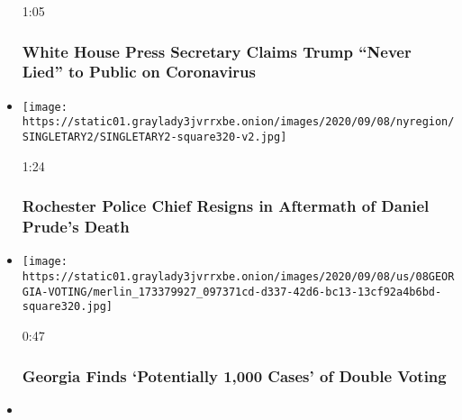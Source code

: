 \begin{itemize}
  1:05

  \hypertarget{white-house-press-secretary-claims-trump-never-lied-to-public-on-coronavirus}{%
  \subsubsection{White House Press Secretary Claims Trump ``Never Lied''
  to Public on
  Coronavirus}\label{white-house-press-secretary-claims-trump-never-lied-to-public-on-coronavirus}}
\item
  \href{https://www.nytimes3xbfgragh.onion/video/us/politics/100000007330362/rochester-police-chief-resigns-video.html?action=click\&module=video-series-bar\&region=header\&pgtype=Article\&playlistId=video/us-politics}{}

  \texttt{[image: https://static01.graylady3jvrrxbe.onion/images/2020/09/08/nyregion/SINGLETARY2/SINGLETARY2-square320-v2.jpg]}

  1:24

  \hypertarget{rochester-police-chief-resigns-in-aftermath-of-daniel-prudes-death}{%
  \subsubsection{Rochester Police Chief Resigns in Aftermath of Daniel
  Prude's
  Death}\label{rochester-police-chief-resigns-in-aftermath-of-daniel-prudes-death}}
\item
  \href{https://www.nytimes3xbfgragh.onion/video/us/elections/100000007330247/georgia-double-voting-investigation.html?action=click\&module=video-series-bar\&region=header\&pgtype=Article\&playlistId=video/us-politics}{}

  \texttt{[image: https://static01.graylady3jvrrxbe.onion/images/2020/09/08/us/08GEORGIA-VOTING/merlin\_173379927\_097371cd-d337-42d6-bc13-13cf92a4b6bd-square320.jpg]}

  0:47

  \hypertarget{georgia-finds-potentially-1000-cases-of-double-voting}{%
  \subsubsection{Georgia Finds `Potentially 1,000 Cases' of Double
  Voting}\label{georgia-finds-potentially-1000-cases-of-double-voting}}
\item
  \href{https://www.nytimes3xbfgragh.onion/video/us/elections/100000007329950/trump-presidential-campaign-funding.html?action=click\&module=video-series-bar\&region=header\&pgtype=Article\&playlistId=video/us-politics}{}


\end{itemize}
